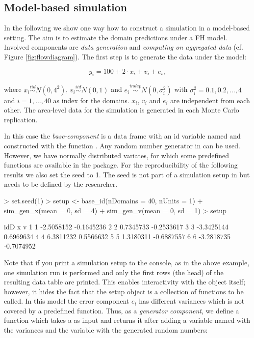 \documentclass[article]{ajs}
\begin{document}
\subsection{Model-based simulation}
\label{sec:csModel}

In the following we show one way how to construct a simulation in a model-based setting. The aim is to estimate the domain predictions under a FH model. Involved components are \textit{data generation} and \textit{computing on aggregated data} (cf. Figure \ref{fig:flowdiagram}). The first step is to generate the data under the model:

\[ y_i = 100 + 2 \cdot x_i + v_i + e_i,\]

where $x_i \stackrel{iid}{\sim} N(0, 4^2)$, $v_i \stackrel{iid}{\sim} N(0, 1)$ and $e_i \stackrel{indep}{\sim} N(0, \sigma_i^2)$ with $\sigma_i^2 = 0.1, 0.2, \dots, 4$ and $i = 1, \dots, 40$ as index for the domains. $x_i$, $v_i$ and $e_i$ are independent from each other. The area-level data for the simulation is generated in each Monte Carlo replication. 

In this case the \textit{base-component} is a data frame with an id variable named  and constructed with the function . Any random number generator in  can be used. However, we have normally distributed variates, for which some predefined functions are available in the package. For the reproducibility of the following results we also set the seed to 1. The seed is not part of a simulation setup in  but needs to be defined by the researcher.

\begin{Schunk}
\begin{Sinput}
> set.seed(1)
> setup <- base_id(nDomains = 40, nUnits = 1) %
+   sim_gen_x(mean = 0, sd = 4) %
+   sim_gen_v(mean = 0, sd = 1)
> setup
\end{Sinput}
\begin{Soutput}
  idD          x          v
1   1 -2.5058152 -0.1645236
2   2  0.7345733 -0.2533617
3   3 -3.3425144  0.6969634
4   4  6.3811232  0.5566632
5   5  1.3180311 -0.6887557
6   6 -3.2818735 -0.7074952
\end{Soutput}
\end{Schunk}

Note that if you print a simulation setup to the console, as in the above example, one simulation run is performed and only the first rows (the head) of the resulting data table are printed. This enables interactivity with the object itself; however, it hides the fact that the setup object is a collection of functions to be called. In this model the error component $e_i$ has different variances which is not covered by a predefined function. Thus, as a \textit{generator component}, we define a function which takes a  as input and returns it after adding a variable named  with the variances and the variable  with the generated random numbers:
\end{document}
